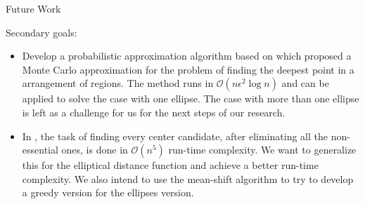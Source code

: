 \documentclass{beamer}
\newcommand{\bigO}{\mathscr{O}}
\begin{document}
\begin{frame}{Future Work}
	
	Secondary goals:
	\begin{itemize}
		 

	\item Develop a probabilistic approximation algorithm based on \autocite{aronov:2008} which proposed a Monte Carlo approximation for the problem of finding the deepest point in a arrangement of regions. The method runs in $\bigO(n\epsilon^2\log{n})$ and can be applied to solve the case with one ellipse. The case with more than one ellipse is left as a challenge for us for the next steps of our research.
	
	\item In \autocite{zhou}, the task of finding every center candidate, after eliminating all the non-essential ones, is done in $\bigO(n^5)$ run-time complexity. We want to generalize this for the elliptical distance function and achieve a better run-time complexity. We also intend to use the mean-shift algorithm to try to develop a greedy version for the ellipses version.
	
		\end{itemize}
\end{frame}

\begin{frame}[allowframebreaks]
%
%	
\printbibliography
\end{frame}
\end{document}
